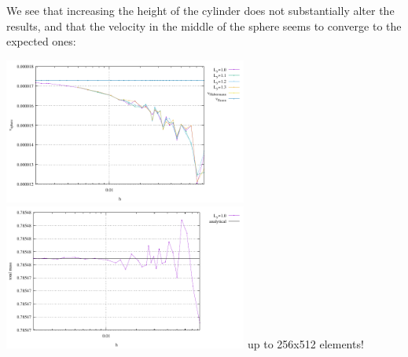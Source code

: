We see that increasing the height of the cylinder does not substantially alter the results, and that 
the velocity in the middle of the sphere seems to converge to the expected ones:
\begin{center}
\includegraphics[width=8cm]{python_codes/fieldstone_91/results/vc.pdf}
\includegraphics[width=8cm]{python_codes/fieldstone_91/results/mass.pdf}
{\captionfont up to 256x512 elements!}
\end{center}


